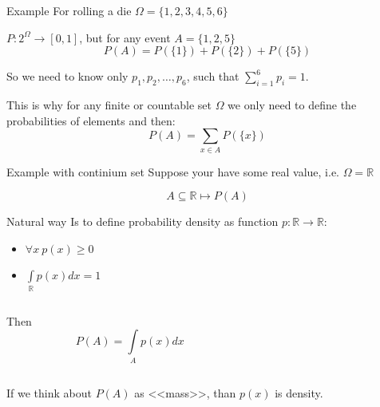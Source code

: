 \documentclass[fullscreen=true, bookmarks=true, hyperref={pdfencoding=unicode}]{beamer}
\begin{document}
\begin{frame}{Example}
  For rolling a die $\Omega = \{1, 2, 3, 4, 5, 6\}$

  \pause
  $P: 2^\Omega \to [0, 1]$, but for any event $A = \{1, 2, 5\}$
  $$ P(A) = P(\{1\}) + P(\{2\}) + P(\{5\})$$

  \pause
  So we need to know only $p_1, p_2, \dots, p_6$, such that 
  $\sum\limits_{i=1}^6 p_i = 1$.

  \pause
  This is why for any finite or countable set $\Omega$ we only need to define 
  the probabilities of elements and then: $$P(A) = \sum\limits_{x \in A} P(\{x\})$$
\end{frame}


\begin{frame}{Example with continium set}
  Suppose your have some real value, i.e. $\Omega = \mathbb{R}$

  $$A \subseteq \mathbb{R} \mapsto P(A)$$

  \pause
  \begin{block}{Natural way}
    Is to define probability density as function $p:\mathbb{R} \to \mathbb{R}$:
    \begin{itemize}
      \pause\item $\forall x\ p(x) \geq 0$
      \pause\item $\int\limits_{\mathbb{R}} p(x)dx = 1$
    \end{itemize}
  \end{block}
    
  \pause
    \begin{columns}
      \begin{column}{0.5\textwidth}
        Then $$P(A) = \int\limits_{A} p(x)dx$$      
      \end{column}
      \begin{column}{0.5\textwidth}
      \end{column}
  \end{columns}

  \vspace{0.3cm}
  If we think about $P(A)$ as <<mass>>, than $p(x)$ is density.
\end{frame}
\end{document}
